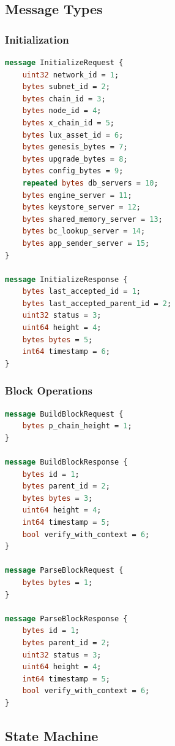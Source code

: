 \documentclass[11pt,letterpaper]{article}
\begin{document}
\subsection{Message Types}

\subsubsection{Initialization}

\begin{lstlisting}[language=protobuf, caption=Initialization Messages]
message InitializeRequest {
    uint32 network_id = 1;
    bytes subnet_id = 2;
    bytes chain_id = 3;
    bytes node_id = 4;
    bytes x_chain_id = 5;
    bytes lux_asset_id = 6;
    bytes genesis_bytes = 7;
    bytes upgrade_bytes = 8;
    bytes config_bytes = 9;
    repeated bytes db_servers = 10;
    bytes engine_server = 11;
    bytes keystore_server = 12;
    bytes shared_memory_server = 13;
    bytes bc_lookup_server = 14;
    bytes app_sender_server = 15;
}

message InitializeResponse {
    bytes last_accepted_id = 1;
    bytes last_accepted_parent_id = 2;
    uint32 status = 3;
    uint64 height = 4;
    bytes bytes = 5;
    int64 timestamp = 6;
}
\end{lstlisting}

\subsubsection{Block Operations}

\begin{lstlisting}[language=protobuf, caption=Block Messages]
message BuildBlockRequest {
    bytes p_chain_height = 1;
}

message BuildBlockResponse {
    bytes id = 1;
    bytes parent_id = 2;
    bytes bytes = 3;
    uint64 height = 4;
    int64 timestamp = 5;
    bool verify_with_context = 6;
}

message ParseBlockRequest {
    bytes bytes = 1;
}

message ParseBlockResponse {
    bytes id = 1;
    bytes parent_id = 2;
    uint32 status = 3;
    uint64 height = 4;
    int64 timestamp = 5;
    bool verify_with_context = 6;
}
\end{lstlisting}

\subsection{State Machine}
\end{document}

